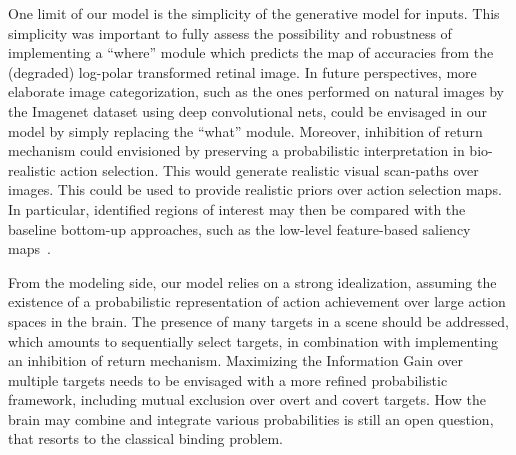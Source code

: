 


One limit of our model is the simplicity of the generative model for inputs. This simplicity was important to fully assess the possibility and robustness of implementing a ``where'' module which predicts the map of accuracies from the (degraded) log-polar transformed retinal image.
In future perspectives, more elaborate image categorization, such as the ones performed on natural images by the Imagenet dataset using deep convolutional nets, could be envisaged in our model by simply replacing the ``what'' module. 
Moreover, inhibition of return mechanism could envisioned by preserving a probabilistic interpretation in bio-realistic action selection. This would generate realistic visual scan-paths over images. This could be used to provide realistic priors over action selection maps.  In particular, identified regions of interest may then be compared with the baseline bottom-up approaches, such as the low-level feature-based saliency maps~\citep{Itti01}. 


From the modeling side, our model relies on a strong idealization, assuming the existence of a probabilistic representation of action achievement over large action spaces in the brain. The presence of many targets in a scene should be addressed, which amounts to sequentially select targets, in combination with implementing an inhibition of return mechanism. Maximizing the Information Gain over multiple targets needs to be envisaged with a more refined probabilistic framework, including mutual exclusion over overt and covert targets. How the brain may combine and integrate various probabilities is still an open question, that resorts to the classical binding problem. %
